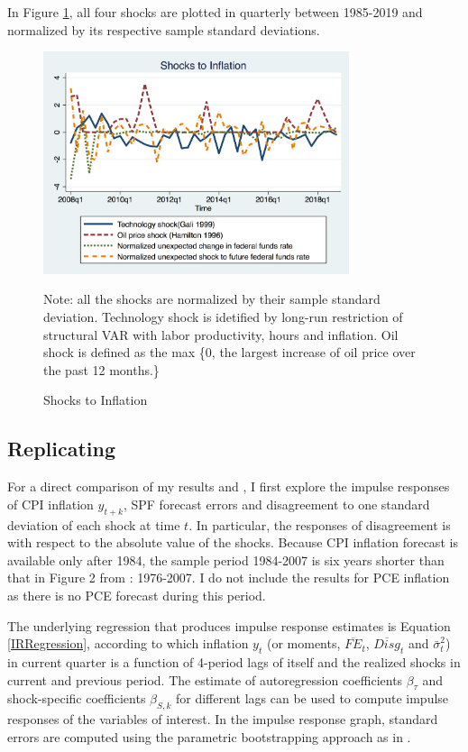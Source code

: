 \documentclass[12pt]{article}
\begin{document}
	In Figure \ref{Inflationshocks}, all four shocks are plotted in quarterly between 1985-2019 and normalized by its respective sample standard deviations. 
	
	\begin{figure}[ht]
		\centering
		\includegraphics[width=0.8\textwidth,totalheight=0.6\textwidth]{figures/inf_shocksQ.png}
			\begin{flushleft}
			{\footnotesize Note: all the shocks are normalized by their sample standard deviation. Technology shock is idetified by long-run restriction of structural VAR with labor productivity, hours and inflation. Oil shock is defined as the max \{0, the largest increase of oil price over the past 12 months.\} }
		\end{flushleft}
		\caption{ Shocks to Inflation}
		\label{Inflationshocks}
	\end{figure}
	
	\subsection{Replicating \citet{coibion2012can}}
	
	For a direct comparison of my results and \citet{coibion2012can}, I first explore the impulse responses of CPI inflation $y_{t+k}$, SPF forecast errors and disagreement to one standard deviation of each shock at time $t$. In particular, the responses of disagreement is with respect to the absolute value of the shocks. Because CPI inflation forecast is available only after 1984, the sample period 1984-2007 is six years shorter than that in Figure 2 from \citet{coibion2012can}: 1976-2007. I do not include the results for PCE inflation as there is no PCE forecast during this period. 
	
	The underlying regression that produces impulse response estimates is  Equation \ref{IRRegression}, according to which inflation $y_t$ (or moments, $\overline {FE}_{t}$, $\overline{Disg}_t$ and $\bar \sigma^2_t$) in current quarter is a function of 4-period lags of itself and the realized shocks in current and previous period. The estimate of autoregression coefficients $\beta_\tau$ and shock-specific coefficients $\beta_{S,k}$ for different lags can be used to compute impulse responses of the variables of interest. In the impulse response graph, standard errors are computed using the parametric bootstrapping approach as in \citet{coibion2012can}. 
	
\end{document}
